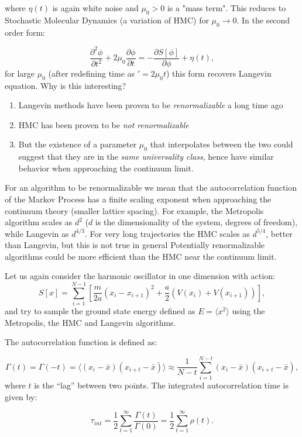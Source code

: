 \documentclass[%
oneside,                 %
final,                   %
10pt]{article}
\begin{document}
where $\eta(t)$ is again white noise and $\mu_0 > 0$ is a "mass
term". This reduces to Stochastic Molecular Dynamics (a variation of
HMC) for $\mu_0 \rightarrow 0$. In the second order form:

\[
\frac{\partial^2 \phi}{\partial t^2 } + 2\mu_0\frac{\partial \phi}{\partial t} = -\frac{\partial S[\phi]}{\partial \phi}  + \eta(t),
\]
for large $\mu_0$ (after redefining time as $'=2\mu_0t$) this form recovers Langevin equation.
Why is this interesting? 
\begin{enumerate}
\item Langevin methods have been proven to be \textit{renormalizable} a long time ago

\item HMC has been proven to be \textit{not renormalizable}

\item But the existence of a parameter $\mu_0$ that interpolates between the two could suggest that they are in the \textit{same universality class}, hence have similar behavior when approaching the continuum limit. 
\end{enumerate}

\noindent
For an algorithm to be renormalizable we mean that the autocorrelation function of the Markov Process has a finite scaling exponent when approaching the continuum theory (smaller lattice spacing).
For example, the Metropolis algorithm scales as $d^2$ ($d$ is the dimensionality of the system, degrees of freedom), while Langevin as $d^{4/3}$.
For very long trajectories the HMC scales as $d^{5/4}$, better than Langevin, but this is not true in general
Potentially renormalizable algorithms could be more efficient than the HMC near the continuum limit.

Let us  again consider the harmonic oscillator in one dimension with action:
\[
  S[x] = \sum_{i=1}^{N-1}\left[\frac{m}{2a}(x_i - x_{i+1})^2 + \frac{a}{2}\left(V(x_i) + V(x_{i+1})\right)\right],
\]
and try to sample the ground state energy defined as $E=\langle x^2\rangle$ using the Metropolis, the HMC and Langevin algorithms. 

The autocorrelation function is defined as:

\[
\Gamma(t) = \Gamma(-t) = \langle (x_i - \bar x)(x_{i+t} - \bar x)\rangle \approx \frac{1}{N-t}\sum_{i=1}^{N-t}  (x_i - \bar x)(x_{i+t} - \bar x),
\]
where $t$ is the ``lag'' between two points. The integrated autocorrelation time is given by:

\[
\tau_{int} = \frac{1}{2} \sum_{t=1}^\infty \frac{\Gamma(t)}{\Gamma(0)} = \frac{1}{2} \sum_{t=1}^\infty \rho(t).
\]
\end{document}
